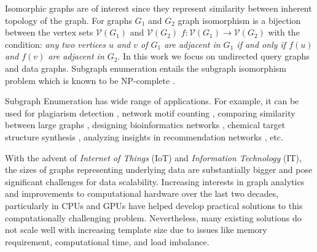 Isomorphic graphs are of interest since they represent similarity between inherent topology of the graph.
For graphs $G_1$ and $G_2$ graph isomorphism is a bijection between the vertex sets $\mathcal{V}(G_1)$ and $\mathcal{V}(G_2)$ $f: \mathcal{V}(G_1) \rightarrow \mathcal{V}(G_2) $ with the condition: \textit{any two vertices $u$ and $v$ of $G_1$ are adjacent in $G_1$ \textit{if and only if} $f(u)$ and $f(v)$ are adjacent in $G_2$}.
In this work we focus on undirected query graphs and data graphs.
Subgraph enumeration entails the subgraph isomorphism problem which is known to be NP-complete \cite{Book:Complexity_Theory}.

Subgraph Enumeration has wide range of applications.
For example, it can be used for plagiarism detection \cite{quasi-clique-plagiarism}, network motif counting \cite{motif-counting-application}, comparing similarity between large graphs \cite{large-graph-comparison-application}, designing bioinformatics networks \cite{bioinformatics-application}, chemical target structure synthesis \cite{chemical-target-application}, analyzing insights in recommendation networks \cite{recommendation-network-application}, etc.

With the advent of \textit{Internet of Things} (IoT) and \textit{Information Technology} (IT), the sizes of graphs representing underlying data are substantially bigger and pose
significant
challenges for data scalability.
Increasing interests in graph analytics and improvements to computational hardware over the last two decades, particularly in CPUs and GPUs have helped develop practical solutions to this computationally challenging problem.
Nevertheless, many existing solutions do not scale well with increasing template size due to issues like memory requirement, computational time, and load imbalance.


